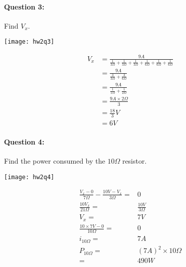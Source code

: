 \documentclass[12pt,letterpaper,titlepage]{article}
\begin{document}
\begin{raggedright}
\clearpage

\paragraph{Question 3: }

Find $V_x$.

\begin{center}
\texttt{[image: hw2q3]}
\end{center}

\begin{align*}
 V_x &= \frac{9A}{\frac{1}{3\Omega}+\frac{1}{3\Omega}+\frac{1}{3\Omega}+\frac{1}{6\Omega}+\frac{1}{6\Omega}+\frac{1}{6\Omega}}
\\   &= \frac{9A}{\frac{3}{3\Omega}+\frac{3}{6\Omega}}
\\   &= \frac{9A}{\frac{1}{1\Omega}+\frac{1}{2\Omega}}
\\   &= \frac{9A \times 2\Omega}{3}
\\   &= \frac{18}{3}V
\\   &= 6V
\end{align*}

\clearpage

\paragraph{Question 4: }

Find the power consumed by the $10\Omega$ resistor.

\begin{center}
\texttt{[image: hw2q4]}
\end{center}

\begin{align*}
    \frac{V_x-0}{7\Omega}-\frac{10V-V_x}{3\Omega}=&0
\\  \frac{10V_x}{21\Omega}=& \frac{10V}{3\Omega}
\\  V_x =& 7V
\\  \frac{10\times7V - 0}{10\Omega} =& 0
\\  i_{10\Omega} =& 7A
\\  P_{10\Omega} =& (7A)^2\times 10\Omega
\\   =& 490W
\end{align*}

\end{raggedright}
\end{document}
